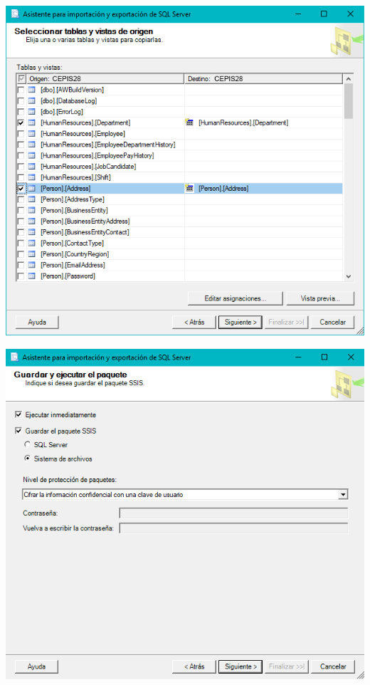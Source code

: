 	\begin{center}
	\includegraphics[width=\columnwidth]{images/task1/img7}
    \end{center}	
    
	\begin{center}
	\includegraphics[width=\columnwidth]{images/task1/img8}
    \end{center}	
    
